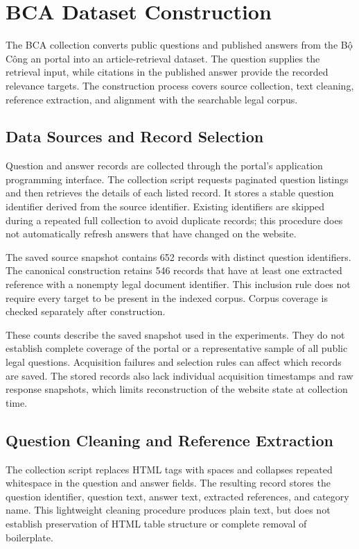 \section{BCA Dataset Construction}
\label{sec:bca-construction}

The BCA collection converts public questions and published answers from the Bộ Công an portal into an article-retrieval dataset. The question supplies the retrieval input, while citations in the published answer provide the recorded relevance targets. The construction process covers source collection, text cleaning, reference extraction, and alignment with the searchable legal corpus.

\subsection{Data Sources and Record Selection}

Question and answer records are collected through the portal's application programming interface. The collection script requests paginated question listings and then retrieves the details of each listed record. It stores a stable question identifier derived from the source identifier. Existing identifiers are skipped during a repeated full collection to avoid duplicate records; this procedure does not automatically refresh answers that have changed on the website.

The saved source snapshot contains 652 records with distinct question identifiers. The canonical construction retains 546 records that have at least one extracted reference with a nonempty legal document identifier. This inclusion rule does not require every target to be present in the indexed corpus. Corpus coverage is checked separately after construction.

These counts describe the saved snapshot used in the experiments. They do not establish complete coverage of the portal or a representative sample of all public legal questions. Acquisition failures and selection rules can affect which records are saved. The stored records also lack individual acquisition timestamps and raw response snapshots, which limits reconstruction of the website state at collection time.

\subsection{Question Cleaning and Reference Extraction}

The collection script replaces HTML tags with spaces and collapses repeated whitespace in the question and answer fields. The resulting record stores the question identifier, question text, answer text, extracted references, and category name. This lightweight cleaning procedure produces plain text, but does not establish preservation of HTML table structure or complete removal of boilerplate.

